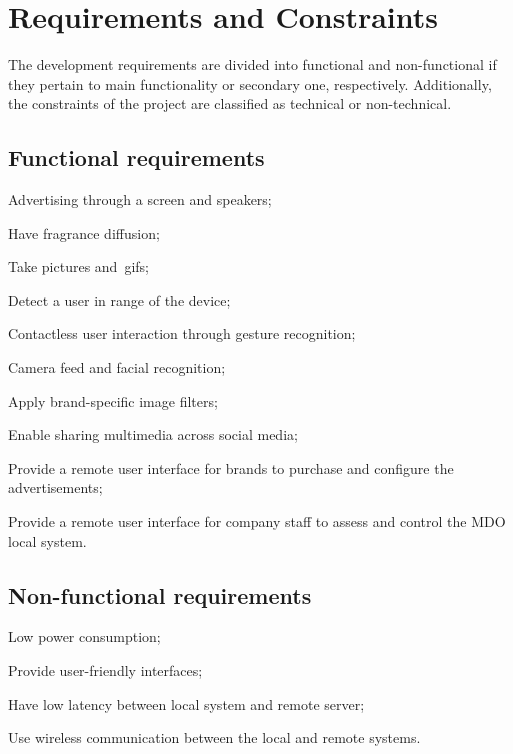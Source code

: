 \section{Requirements and Constraints}
\label{sec:req-const}
%
The development requirements are divided into functional and non-functional if they pertain to main functionality or secondary one, respectively. Additionally, the constraints of the project are classified as technical or non-technical.

\subsection{Functional requirements}
\label{sec:funct-requ}
%
\begin{item-c}
\item Advertising through a screen and speakers;
\item Have fragrance diffusion;
\item Take pictures and~\gls{gif}s;
\item Detect a user in range of the device;
\item Contactless user interaction through gesture recognition;
\item Camera feed and facial recognition;
\item Apply brand-specific image filters;
\item Enable sharing multimedia across social media;
\item Provide a remote user interface for brands to purchase and configure the advertisements;
\item Provide a remote user interface for company staff to assess and control
  the MDO local system.
\end{item-c}
%
\subsection{Non-functional requirements}
\label{sec:non-funct-requ}
%
\begin{item-c}
\item Low power consumption;
\item Provide user-friendly interfaces;
\item Have low latency between local system and remote server;
\item Use wireless communication between the local and remote systems.
\end{item-c}
%
